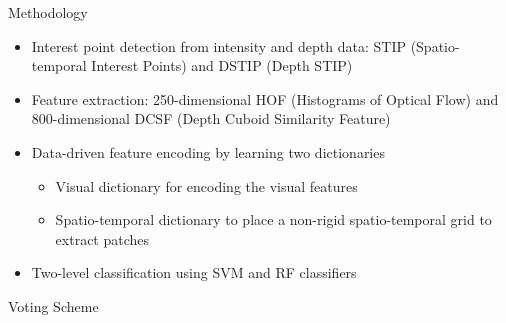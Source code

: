\documentclass[final,hyperref={pdfpagelabels=false}]{beamer}
\begin{document}
\begin{frame}[t]
\begin{columns}[t]
\begin{column}{.465\textwidth}
\begin{block}{Methodology}
\begin{itemize}
\item Interest point detection from intensity and depth data: STIP (Spatio-temporal Interest Points) and DSTIP (Depth STIP)
\item Feature extraction: 250-dimensional HOF (Histograms of Optical Flow) and 800-dimensional DCSF (Depth Cuboid Similarity Feature)
\item Data-driven feature encoding \cite{twinanda2015data} by learning two dictionaries
	\begin{itemize}
    	\item Visual dictionary for encoding the visual features
        \item Spatio-temporal dictionary to place a non-rigid spatio-temporal grid to extract patches 
	\end{itemize}
\item Two-level classification using SVM and RF classifiers
    

\end{itemize}

\end{block}


\begin{block}{Voting Scheme}


\end{block}
\end{column}
\end{columns}
\end{frame}
\end{document}
